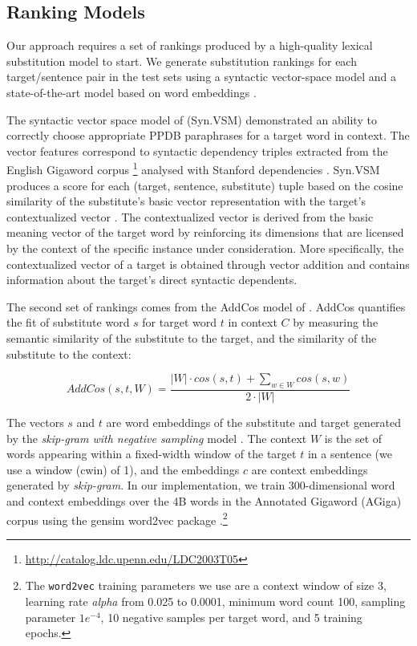 \documentclass[11pt]{article}
\begin{document}
\subsection{Ranking Models}

Our approach requires a set of rankings produced by a high-quality lexical substitution model to start. We generate substitution rankings for each target/sentence pair in the test sets using a syntactic vector-space model \cite{thater-furstenau-pinkal:2011:IJCNLP-2011,apidianaki:2016:EMNLP2016} and a state-of-the-art model based on word embeddings \cite{melamud-levy-dagan:2015:VSM-NLP}. 

The syntactic vector space model of  (Syn.VSM) demonstrated an ability to correctly choose appropriate PPDB paraphrases for a target word in context. The vector features correspond to syntactic dependency triples extracted from the English Gigaword corpus \footnote{\url{http://catalog.ldc.upenn.edu/LDC2003T05}} analysed with Stanford dependencies \cite{mcdm:06}. Syn.VSM produces a score for each (target, sentence, substitute) tuple based on the cosine similarity of the substitute's basic vector representation with the target's contextualized vector \cite{thater-furstenau-pinkal:2011:IJCNLP-2011}. The contextualized vector is derived from the basic meaning vector of the target word by reinforcing its dimensions that are licensed by the context of the specific instance under consideration. More specifically, the contextualized vector of a target is obtained through vector addition and contains information about the target's direct syntactic dependents. 

The second set of rankings comes from the AddCos model of . AddCos quantifies the fit of substitute word $s$ for target word $t$ in context $C$ by measuring the semantic similarity of the substitute to the target, and the similarity of the substitute to the context:

\begin{dmath}
	AddCos(s,t,W) = \frac{|W| \cdot cos(s,t) + \sum_{w \in W} cos(s,w)}{2 \cdot |W|}
\end{dmath}
	
\noindent The vectors $s$ and $t$ are word embeddings of the substitute and target generated by the \textit{skip-gram with negative sampling} model \cite{mikolov2013distributed,mikolov2013efficient}. The context $W$ is the set of words appearing within a fixed-width window of the target $t$ in a sentence (we use a window (cwin) of 1), and the embeddings $c$ are context embeddings generated by \textit{skip-gram}. In our implementation, we train 300-dimensional word and context embeddings over the 4B words in the Annotated Gigaword (AGiga) corpus \cite{napoles2012annotated} using the gensim word2vec package \cite{mikolov2013distributed,mikolov2013efficient,ismu:884893}.\footnote{The \texttt{word2vec} training parameters we use are a context window of size 3, learning rate \textit{alpha} from 0.025 to 0.0001, minimum word count 100, sampling parameter $1e^{-4}$, 10 negative samples per target word, and 5 training epochs.}
\end{document}
